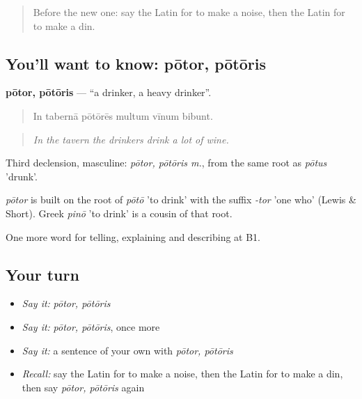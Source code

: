 \label{lesson:LA-C448-potor}



\begin{quote}
Before the new one: say the Latin for to make a noise, then the Latin for to make a din.
\end{quote}

\subsection*{You'll want to know: pōtor, pōtōris}
\textbf{pōtor, pōtōris} — \textquotedblleft{}a drinker, a heavy drinker\textquotedblright{}.

\begin{quote}
In tabernā pōtōrēs multum vīnum bibunt.
\end{quote}

\begin{quote}
\emph{In the tavern the drinkers drink a lot of wine.}
\end{quote}

Third declension, masculine: \emph{pōtor, pōtōris m.}, from the same root as \emph{pōtus} 'drunk'.

\begin{cousinweb}
\emph{pōtor} is built on the root of \emph{pōtō} 'to drink' with the suffix \emph{-tor} 'one who' (Lewis \& Short). Greek \emph{pinō} 'to drink' is a cousin of that root.
\end{cousinweb}

\begin{grammarlens}[title={What you've built}]
One more word for telling, explaining and describing at B1.
\end{grammarlens}

\subsection*{Your turn}
\begin{itemize}
\raggedright
  \item \emph{Say it:} \emph{pōtor, pōtōris}
  \item \emph{Say it:} \emph{pōtor, pōtōris}, once more
  \item \emph{Say it:} a sentence of your own with \emph{pōtor, pōtōris}
  \item \emph{Recall:} say the Latin for to make a noise, then the Latin for to make a din, then say \emph{pōtor, pōtōris} again
\end{itemize}

